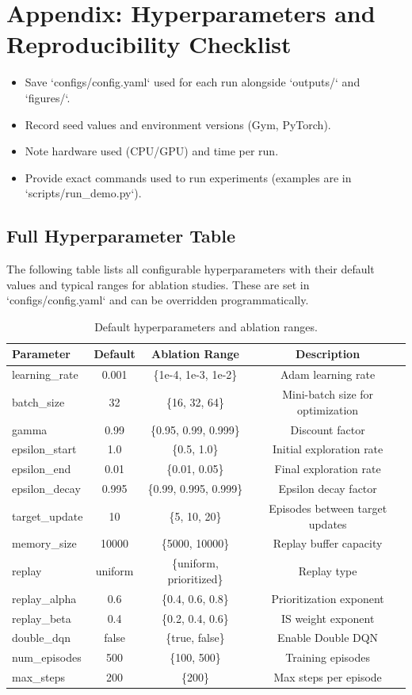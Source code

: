 \documentclass{IEEEtran}
\begin{document}
\section{Appendix: Hyperparameters and Reproducibility Checklist}

\begin{itemize}
\item Save `configs/config.yaml` used for each run alongside `outputs/` and `figures/`.
\item Record seed values and environment versions (Gym, PyTorch).
\item Note hardware used (CPU/GPU) and time per run.
\item Provide exact commands used to run experiments (examples are in `scripts/run_demo.py`).
\end{itemize}

\subsection{Full Hyperparameter Table}

The following table lists all configurable hyperparameters with their default values and typical ranges for ablation studies. These are set in `configs/config.yaml` and can be overridden programmatically.

\begin{table}[H]
\centering
\caption{Default hyperparameters and ablation ranges.}
\label{tab:hyperparams}
\begin{tabular}{@{}lccc@{}}
\toprule
Parameter & Default & Ablation Range & Description \\
\midrule
learning\_rate & 0.001 & \{1e-4, 1e-3, 1e-2\} & Adam learning rate \\
batch\_size & 32 & \{16, 32, 64\} & Mini-batch size for optimization \\
gamma & 0.99 & \{0.95, 0.99, 0.999\} & Discount factor \\
epsilon\_start & 1.0 & \{0.5, 1.0\} & Initial exploration rate \\
epsilon\_end & 0.01 & \{0.01, 0.05\} & Final exploration rate \\
epsilon\_decay & 0.995 & \{0.99, 0.995, 0.999\} & Epsilon decay factor \\
target\_update & 10 & \{5, 10, 20\} & Episodes between target updates \\
memory\_size & 10000 & \{5000, 10000\} & Replay buffer capacity \\
replay & uniform & \{uniform, prioritized\} & Replay type \\
replay\_alpha & 0.6 & \{0.4, 0.6, 0.8\} & Prioritization exponent \\
replay\_beta & 0.4 & \{0.2, 0.4, 0.6\} & IS weight exponent \\
double\_dqn & false & \{true, false\} & Enable Double DQN \\
num\_episodes & 500 & \{100, 500\} & Training episodes \\
max\_steps & 200 & \{200\} & Max steps per episode \\
\bottomrule
\end{tabular}
\end{table}
\end{document}
